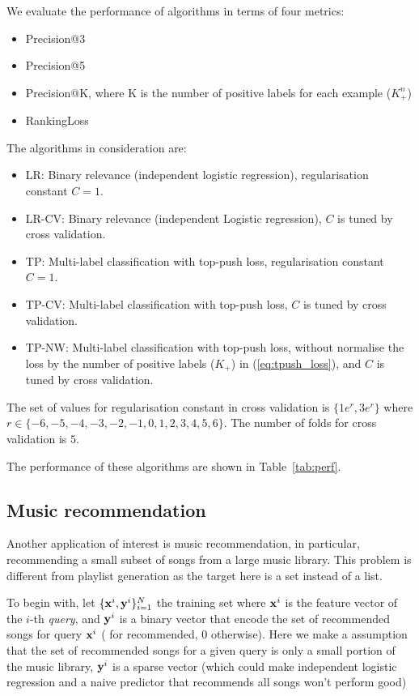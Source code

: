 \noindent
We evaluate the performance of algorithms in terms of four metrics:
\begin{itemize}
\item Precision@3
\item Precision@5
\item Precision@K, where K is the number of positive labels for each example (\ie $K_+^n$)
\item RankingLoss
\end{itemize}

\noindent
The algorithms in consideration are:
\begin{itemize}
\item LR: Binary relevance (\ie independent logistic regression), regularisation constant $C = 1$.
\item LR-CV: Binary relevance (\ie independent Logistic regression), $C$ is tuned by cross validation.
\item TP: Multi-label classification with top-push loss, regularisation constant $C=1$.
\item TP-CV: Multi-label classification with top-push loss, $C$ is tuned by cross validation.
\item TP-NW: Multi-label classification with top-push loss, without normalise the loss by the number of positive labels (\ie $K_+$)
             in (\ref{eq:tpush_loss}), and $C$ is tuned by cross validation.
\end{itemize}
The set of values for regularisation constant in cross validation is 
$\{ 1e^{r}, 3e^{r} \}$ where $r \in \{-6, -5, -4, -3, -2, -1, 0, 1, 2, 3, 4, 5, 6\}$. 
The number of folds for cross validation is $5$.


\noindent
The performance of these algorithms are shown in Table~\ref{tab:perf}.




\subsection{Music recommendation}

Another application of interest is music recommendation, in particular, recommending a small subset of songs from a large music library.
This problem is different from playlist generation%
as the target here is a set instead of a list.

To begin with, let $\{\mathbf{x}^i, \mathbf{y}^i\}_{i=1}^N$ the training set where $\mathbf{x}^i$ is the feature vector of the $i$-th \emph{query},
and $\mathbf{y}^i$ is a binary vector that encode the set of recommended songs for query $\mathbf{x}^i$ ( for recommended, 0 otherwise).
Here we make a assumption that the set of recommended songs for a given query is only a small portion of the music library,
\ie $\mathbf{y}^i$ is a sparse vector (which could make independent logistic regression and a naive predictor that recommends all songs won't perform good)

